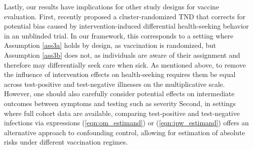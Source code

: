 \documentclass[11pt]{article}
\begin{document}

Lastly, our results have implications for other study designs for vaccine evaluation. First, \textcite{wang_randomization_2022} recently proposed a cluster-randomized TND that corrects for potential bias caused by intervention-induced differential health-seeking behavior in an unblinded trial. In our framework, this corresponds to a setting where Assumption \ref{ass3a} holds by design, as vaccination is randomized, but Assumption \ref{ass3b} does not, as individuals are aware of their assignment and therefore may differentially seek care when sick. As mentioned above, to remove the influence of intervention effects on health-seeking requires them be equal across test-positive and test-negative illnesses on the multiplicative scale. However, one should also carefully consider potential effects on intermediate outcomes between symptoms and testing such as severity Second, in settings where full cohort data are available, comparing test-positive and test-negative infections via expressions (\ref{eqn:om_estimand}) or (\ref{eqn:ipw_estimand}) offers an alternative approach to confounding control, allowing for estimation of absolute risks under different vaccination regimes. 

\end{document}
